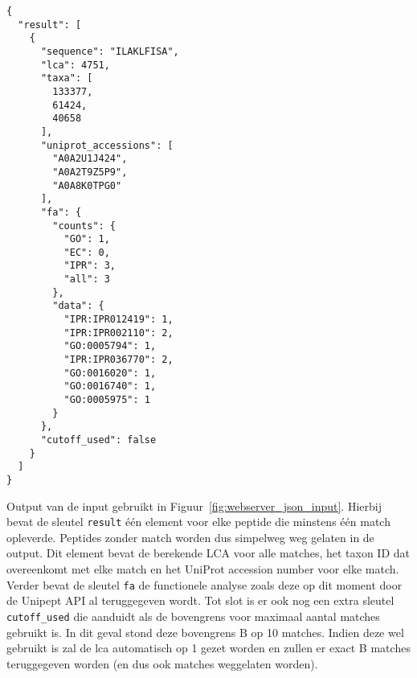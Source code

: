 \begin{listing}[h!]
    \begin{verbatim}
{
  "result": [
    {
      "sequence": "ILAKLFISA",
      "lca": 4751,
      "taxa": [
        133377,
        61424,
        40658
      ],
      "uniprot_accessions": [
        "A0A2U1J424",
        "A0A2T9Z5P9",
        "A0A8K0TPG0"
      ],
      "fa": {
        "counts": {
          "GO": 1,
          "EC": 0,
          "IPR": 3,
          "all": 3
        },
        "data": {
          "IPR:IPR012419": 1,
          "IPR:IPR002110": 2,
          "GO:0005794": 1,
          "IPR:IPR036770": 2,
          "GO:0016020": 1,
          "GO:0016740": 1,
          "GO:0005975": 1
        }
      },
      "cutoff_used": false
    }
  ]
}
    \end{verbatim}
    \caption{Output van de input gebruikt in Figuur~\ref{fig:webserver_json_input}.
    Hierbij bevat de sleutel \texttt{result} één element voor elke peptide die minstens één match opleverde.
    Peptides zonder match worden dus simpelweg weg gelaten in de output.
    Dit element bevat de berekende LCA voor alle matches, het taxon ID dat overeenkomt met elke match en het UniProt accession number voor elke match.
    Verder bevat de sleutel \texttt{fa} de functionele analyse zoals deze op dit moment door de Unipept API al teruggegeven wordt.
    Tot slot is er ook nog een extra sleutel \texttt{cutoff\_used} die aanduidt als de bovengrens voor maximaal aantal matches gebruikt is.
    In dit geval stond deze bovengrens B op 10 matches.
    Indien deze wel gebruikt is zal de lca automatisch op 1 gezet worden en zullen er exact B matches teruggegeven worden (en dus ook matches weggelaten worden).}
    \label{fig:webserver_json_output}
\end{listing}

